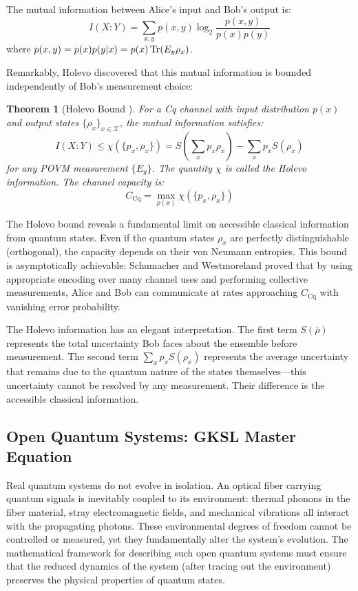 \documentclass[12pt,a4paper]{article}
\newtheorem{theorem}{Theorem}[section]
\begin{document}
The mutual information between Alice's input and Bob's output is:
\begin{equation}
I(X:Y) = \sum_{x,y} p(x,y) \log_2 \frac{p(x,y)}{p(x)p(y)}
\end{equation}
where $p(x,y) = p(x)p(y|x) = p(x)\Tr(E_y \rho_x)$.

Remarkably, Holevo discovered that this mutual information is bounded independently of Bob's measurement choice:

\begin{theorem}[Holevo Bound \cite{holevo1973}]
For a Cq channel with input distribution $p(x)$ and output states $\{\rho_x\}_{x \in \mathcal{X}}$, the mutual information satisfies:
\begin{equation}
I(X:Y) \leq \chi(\{p_x, \rho_x\}) = S\left(\sum_{x} p_x \rho_x\right) - \sum_{x} p_x S(\rho_x)
\end{equation}
for any POVM measurement $\{E_y\}$. The quantity $\chi$ is called the Holevo information. The channel capacity is:
\begin{equation}
C_{\text{Cq}} = \max_{p(x)} \chi(\{p_x, \rho_x\})
\end{equation}
\end{theorem}

The Holevo bound reveals a fundamental limit on accessible classical information from quantum states. Even if the quantum states $\rho_x$ are perfectly distinguishable (orthogonal), the capacity depends on their von Neumann entropies. This bound is asymptotically achievable: Schumacher and Westmoreland \cite{schumacher1997} proved that by using appropriate encoding over many channel uses and performing collective measurements, Alice and Bob can communicate at rates approaching $C_{\text{Cq}}$ with vanishing error probability.

The Holevo information has an elegant interpretation. The first term $S(\bar{\rho})$ represents the total uncertainty Bob faces about the ensemble before measurement. The second term $\sum_x p_x S(\rho_x)$ represents the average uncertainty that remains due to the quantum nature of the states themselves—this uncertainty cannot be resolved by any measurement. Their difference is the accessible classical information.

\subsection{Open Quantum Systems: GKSL Master Equation}

Real quantum systems do not evolve in isolation. An optical fiber carrying quantum signals is inevitably coupled to its environment: thermal phonons in the fiber material, stray electromagnetic fields, and mechanical vibrations all interact with the propagating photons. These environmental degrees of freedom cannot be controlled or measured, yet they fundamentally alter the system's evolution. The mathematical framework for describing such open quantum systems must ensure that the reduced dynamics of the system (after tracing out the environment) preserves the physical properties of quantum states.
\end{document}
